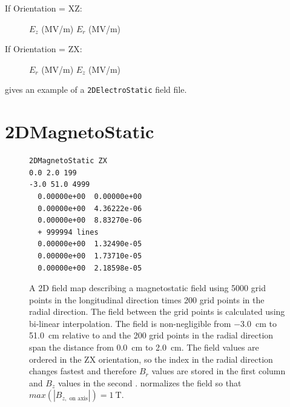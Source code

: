 \begin{description}
\item[If Orientation = XZ:] $E_{z}$ (MV/m) $E_{r}$ (MV/m)
\item[If Orientation = ZX:] $E_{r}$ (MV/m) $E_{z}$ (MV/m)
\end{description}

 gives an example of a \texttt{2DElectroStatic} field file.


\section{2DMagnetoStatic}
\label{sec:2DMagnetoStatic}
\begin{figure}[h]
  \begin{fmpage}
\begin{verbatim}
2DMagnetoStatic ZX
0.0 2.0 199
-3.0 51.0 4999
  0.00000e+00  0.00000e+00
  0.00000e+00  4.36222e-06
  0.00000e+00  8.83270e-06
  + 999994 lines
  0.00000e+00  1.32490e-05
  0.00000e+00  1.73710e-05
  0.00000e+00  2.18598e-05
\end{verbatim}
  \end{fmpage}
  \caption[Example of a 2DMagnetoStatic field map]{A 2D field map describing a magnetostatic field using 5000 grid points
    in the longitudinal direction times 200 grid points in the radial direction. The field between the grid points is calculated
    using bi-linear interpolation. The field is non-negligible from \SI{-3.0}{\centi\meter} to \SI{51.0}{\centi\meter} relative to  and the 200 grid
    points in the radial direction span the distance from \SI{0.0}{\centi\meter} to \SI{2.0}{\centi\meter}. The field values are ordered in the ZX
    orientation, so the index in the radial direction changes fastest and therefore $B_r$ values are stored in the first column
    and $B_z$ values in the second . \opalt normalizes the field so that $max(|B_{z,\text{ on axis}}|) = \SI{1}{\tesla}$.}
  \label{fig:2DMagnetoStatic}
\end{figure}

